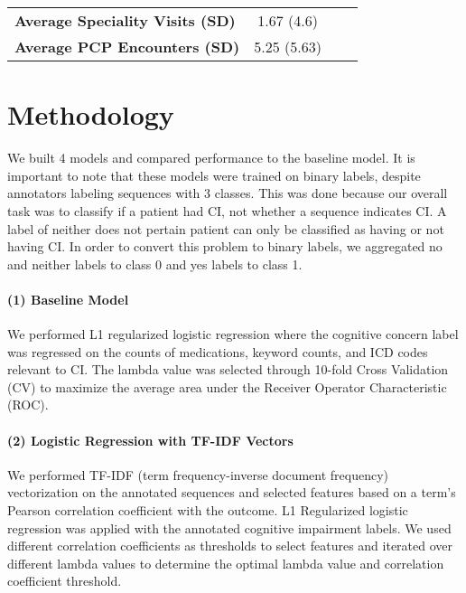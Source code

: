 \documentclass[pmlr,twocolumn,10pt]{jmlr} %
\begin{document}
\begin{table*}[hbtp]
{\begin{tabular}{lccc}
        \textbf{Average Speciality Visits (SD)} & 1.67 (4.6) \\ 
        
        \textbf{Average PCP Encounters (SD)} &  5.25 (5.63) \\ 
        
                
        
        \bottomrule
        \end{tabular}
    }
\end{table*}

\section{Methodology}
\label{sec:Methodology}  
{We built 4 models and compared performance to the baseline model. It is important to note that these models were trained on binary labels, despite annotators labeling sequences with 3 classes. This was done because our overall task was to classify if a patient had CI, not whether a sequence indicates CI. %
A label of neither does not pertain  patient can only be classified as having or not having CI. In order to convert this problem to binary labels, we aggregated no and neither labels to class 0 and yes labels to class 1. }

\label{sec:Baseline}  
\paragraph{(1) Baseline Model} We performed L1 regularized logistic regression where the cognitive concern label was regressed on the counts of medications, keyword counts, and ICD codes relevant to CI. The lambda value was selected through 10-fold Cross Validation (CV) to maximize the average area under the Receiver Operator Characteristic (ROC). %

\label{sec:TFIDF}  
\paragraph{(2) Logistic Regression with TF-IDF Vectors} We performed TF-IDF (term frequency-inverse document frequency) vectorization on the annotated sequences and selected features based on a term's Pearson correlation coefficient with the outcome. L1 Regularized logistic regression was applied with the annotated cognitive impairment labels. We used different correlation coefficients as thresholds to select features and iterated over different lambda values to determine the optimal lambda value and correlation coefficient threshold. 
\end{document}
